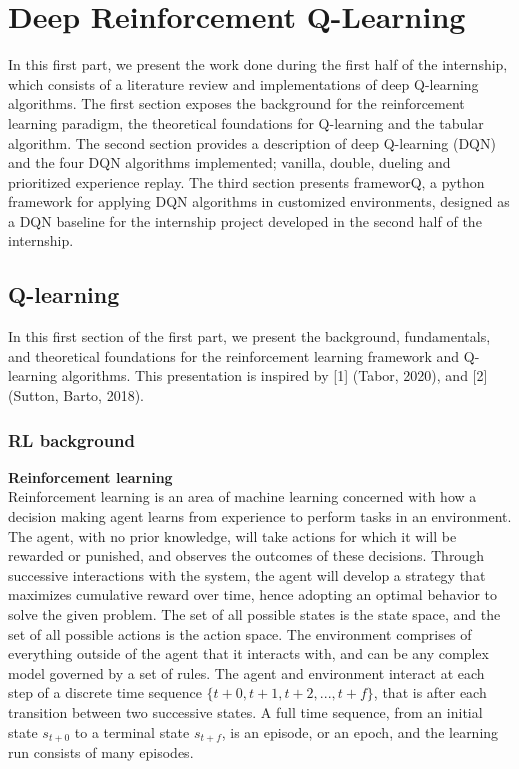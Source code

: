 \section{Deep Reinforcement Q-Learning}

In this first part, we present the work done during the first half of the internship, which consists of a literature review and implementations of deep Q-learning algorithms. The first section exposes the background for the reinforcement learning paradigm, the theoretical foundations for Q-learning and the tabular algorithm. The second section provides a description of deep Q-learning (DQN) and the four DQN algorithms implemented; vanilla, double, dueling and prioritized experience replay. The third section presents frameworQ, a python framework for applying DQN algorithms in customized environments, designed as a DQN baseline for the internship project developed in the second half of the internship.

\subsection{Q-learning}

In this first section of the first part, we present the background, fundamentals, and theoretical foundations for the reinforcement learning framework and Q-learning algorithms. This presentation is inspired by [1] (Tabor, 2020), and [2] (Sutton, Barto, 2018).

\subsubsection{RL background}

\textbf{Reinforcement learning} \\
Reinforcement learning is an area of machine learning concerned with how a decision making agent learns from experience to perform tasks in an environment. The agent, with no prior knowledge, will take actions for which it will be rewarded or punished, and observes the outcomes of these decisions. Through successive interactions with the system, the agent will develop a strategy that maximizes cumulative reward over time, hence adopting an optimal behavior to solve the given problem. The set of all possible states is the state space, and the set of all possible actions is the action space. The environment comprises of everything outside of the agent that it interacts with, and can be any complex model governed by a set of rules. The agent and environment interact at each step of a discrete time sequence $ \{t + 0, t + 1, t + 2, ..., t + f\} $, that is after each transition between two successive states. A full time sequence, from an initial state $s_{t+0}$ to a terminal state $s_{t+f}$, is an episode, or an epoch, and the learning run consists of many episodes. \\

